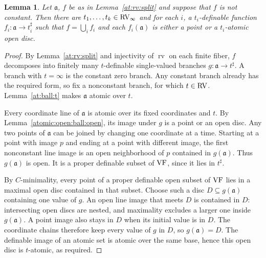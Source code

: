 \documentclass[12pt]{amsart}
\theoremstyle{plain}
\newtheorem{lem}[thm]{Lemma}
\theoremstyle{definition}
\theoremstyle{remark}
\numberwithin{equation}{section}
\theoremstyle{plain}
\newcommand{\VF}{\textup{VF}}
\newcommand{\RV}{\textup{RV}}
\newcommand{\cmin}{$C$\nobreakdash}
\newcommand{\ga}{\mathfrak{a}}
\newcommand{\0}{\emptyset}
\newcommand{\fun}{\longrightarrow}
\newcommand{\sub}{\subseteq}
\DeclareMathOperator{\rv}{rv}
\begin{document}
\begin{lem}\label{atomic:open:multidisc}
Let $\ga$, $f$ be as in Lemma~\ref{at:rv:split} and suppose that $f$ is not constant. Then there are $t_1, \ldots, t_k \in \RV_\infty$ and for each $i$, a $t_i$-definable function $f_i : \ga \fun t^\sharp_i$ such that $f = \bigcup_i f_i$ and each $f_i(\ga)$ is either a point or a $t_i$-atomic open disc.
\end{lem}
\begin{proof}
By Lemma~\ref{at:rv:split} and injectivity of $\rv$ on each finite fiber, $f$ decomposes into finitely many $t$-definable single-valued branches $g:\ga\fun t^\sharp$. A branch with $t=\infty$ is the constant zero branch. Any constant branch already has the required form, so fix a nonconstant branch, for which $t\in\RV$. Lemma~\ref{at:ball:t} makes $\ga$ atomic over $t$.

Every coordinate line of $\ga$ is atomic over its fixed coordinates and $t$. By Lemma~\ref{atomic:open:ball:open}, its image under $g$ is a point or an open disc. Any two points of $\ga$ can be joined by changing one coordinate at a time. Starting at a point with image $p$ and ending at a point with different image, the first nonconstant line image is an open neighborhood of $p$ contained in $g(\ga)$. Thus $g(\ga)$ is open. It is a proper definable subset of $\VF$, since it lies in $t^\sharp$.

By \cmin-minimality, every point of a proper definable open subset of $\VF$ lies in a maximal open disc contained in that subset. Choose such a disc $D\sub g(\ga)$ containing one value of $g$. An open line image that meets $D$ is contained in $D$: intersecting open discs are nested, and maximality excludes a larger one inside $g(\ga)$. A point image also stays in $D$ when its initial value is in $D$. The coordinate chains therefore keep every value of $g$ in $D$, so $g(\ga)=D$. The definable image of an atomic set is atomic over the same base, hence this open disc is $t$-atomic, as required.

\end{proof}
\end{document}
